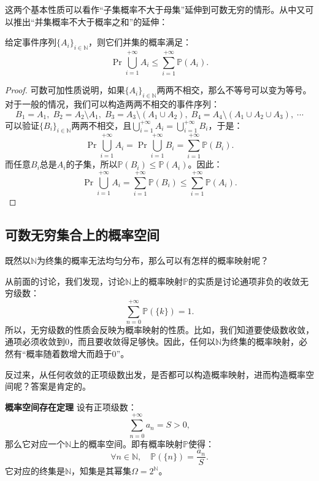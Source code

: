 \documentclass[12pt,UTF8]{ctexbook}
\begin{document}
这两个基本性质可以看作“子集概率不大于母集”延伸到可数无穷的情形。从中又可以推出“并集概率不大于概率之和”的延伸：
\begin{tm}
    给定事件序列$\{A_i\}_{i\in\mathbb{N}}$，则它们并集的概率满足：
    $$ \Pr{\bigcup_{i=1}^{+\infty} A_i} \leqslant \sum_{i=1}^{+\infty} \mathbb{P}(A_i). $$
\end{tm}

\begin{proof}
    可数可加性质说明，如果$\{A_i\}_{i\in\mathbb{N}}$两两不相交，那么不等号可以变为等号。对于一般的情况，我们可以构造两两不相交的事件序列：
    $$ B_1 = A_1, \; B_2 = A_2\setminus A_1, \; B_3 = A_3\setminus (A_1 \cup A_2), \; B_4 = A_4\setminus (A_1 \cup A_2 \cup A_3), \; \cdots$$
    可以验证$\{B_i\}_{i\in\mathbb{N}}$两两不相交，且$\bigcup_{i=1}^{+\infty} A_i = \bigcup_{i=1}^{+\infty} B_i$，于是：
    $$  \Pr{\bigcup_{i=1}^{+\infty} A_i} = \Pr{\bigcup_{i=1}^{+\infty} B_i} = \sum_{i=1}^{+\infty} \mathbb{P}(B_i). $$
    而任意$B_i$总是$A_i$的子集，所以$\mathbb{P}(B_i)\leqslant \mathbb{P}(A_i)$。因此：
    $$ \Pr{\bigcup_{i=1}^{+\infty} A_i} = \sum_{i=1}^{+\infty} \mathbb{P}(B_i) \leqslant \sum_{i=1}^{+\infty} \mathbb{P}(A_i). $$
\end{proof}

\subsection{可数无穷集合上的概率空间}

既然以$\mathbb{N}$为终集的概率无法均匀分布，那么可以有怎样的概率映射呢？

从前面的讨论，我们发现，讨论$\mathbb{N}$上的概率映射$\mathbb{P}$的实质是讨论通项非负的收敛无穷级数：
$$ \sum_{n=0}^{+\infty} \mathbb{P}(\{k\}) = 1. $$
所以，无穷级数的性质会反映为概率映射的性质。比如，我们知道要使级数收敛，通项必须收敛到$0$，而且要收敛得足够快。因此，任何以$\mathbb{N}$为终集的概率映射，必然有“概率随着数增大而趋于$0$”。

反过来，从任何收敛的正项级数出发，是否都可以构造概率映射，进而构造概率空间呢？答案是肯定的。
\begin{tm}{\textbf{概率空间存在定理}}
    设有正项级数：
    $$ \sum_{n=0}^{+\infty} a_n = S > 0,$$
    那么它对应一个$\mathbb{N}$上的概率空间。即有概率映射$\mathbb{P}$使得：
    $$ \forall n\in\mathbb{N},\quad \mathbb{P}(\{n\}) = \frac{a_n}{S}.$$
    它对应的终集是$\mathbb{N}$，知集是其幂集$\Omega = 2^{\mathbb{N}}$。
\end{tm}
\end{document}

